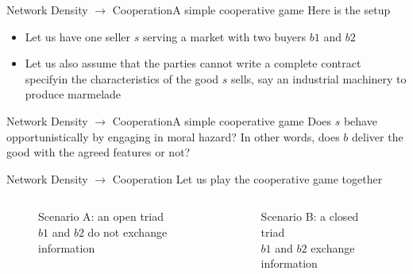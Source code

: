 \documentclass[notes, aspectratio=1610]{beamer}
\begin{document}
\begin{frame}{Network Density $\rightarrow$ Cooperation}{A simple cooperative game}
	Here is the setup 
	
	\begin{itemize}
		\item Let us have one seller $s$ serving a market with two 
		buyers $b1$ and $b2$
		\item Let us also assume that the parties cannot write a 
		complete contract specifyin the characteristics of the good 
		$s$ sells, say an industrial machinery to produce marmelade 
	\end{itemize}
\end{frame}

\begin{frame}{Network Density $\rightarrow$ Cooperation}{A simple cooperative game}
	\LARGE Does $s$ behave opportunistically by engaging in moral hazard? In other 
	words, does $b$ deliver the good with the agreed features or not?
\end{frame}


\begin{frame}
	{Network Density $\rightarrow$ Cooperation}
	{Let us play the cooperative game together}
	\begin{columns}
	\begin{column}{0.5\textwidth}
		\begin{figure}
				\begin{center}
					
				\end{center}
				\caption*{Scenario A: an open triad\\$b1$ and $b2$ do not exchange information}
		\end{figure}
	\end{column}
	\begin{column}{0.5\textwidth}
		\begin{figure}
			\begin{center}
				
			\end{center}
			\caption*{Scenario B: a closed triad\\$b1$ and $b2$ exchange information}
	\end{figure}
	\end{column}
	\end{columns}
\end{frame}
\end{document}
